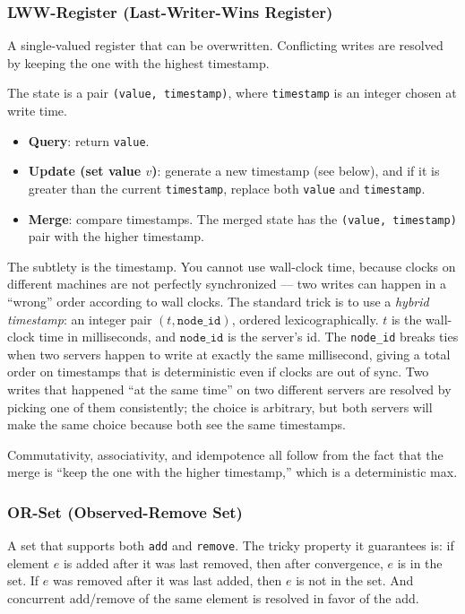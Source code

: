 \documentclass[11pt,a4paper]{article}
\begin{document}
\subsubsection{LWW-Register (Last-Writer-Wins Register)}
A single-valued register that can be overwritten. Conflicting writes are resolved by keeping the one with the highest timestamp.

The state is a pair \texttt{(value, timestamp)}, where \texttt{timestamp} is an integer chosen at write time.

\begin{itemize}
\item \textbf{Query}: return \texttt{value}.
\item \textbf{Update (set value $v$)}: generate a new timestamp (see below), and if it is greater than the current \texttt{timestamp}, replace both \texttt{value} and \texttt{timestamp}.
\item \textbf{Merge}: compare timestamps. The merged state has the \texttt{(value, timestamp)} pair with the higher timestamp.
\end{itemize}

The subtlety is the timestamp. You cannot use wall-clock time, because clocks on different machines are not perfectly synchronized --- two writes can happen in a ``wrong'' order according to wall clocks. The standard trick is to use a \textit{hybrid timestamp}: an integer pair $(t, \texttt{node\_id})$, ordered lexicographically. $t$ is the wall-clock time in milliseconds, and $\texttt{node\_id}$ is the server's id. The \texttt{node\_id} breaks ties when two servers happen to write at exactly the same millisecond, giving a total order on timestamps that is deterministic even if clocks are out of sync. Two writes that happened ``at the same time'' on two different servers are resolved by picking one of them consistently; the choice is arbitrary, but both servers will make the same choice because both see the same timestamps.

Commutativity, associativity, and idempotence all follow from the fact that the merge is ``keep the one with the higher timestamp,'' which is a deterministic max.

\subsubsection{OR-Set (Observed-Remove Set)}
A set that supports both \texttt{add} and \texttt{remove}. The tricky property it guarantees is: if element $e$ is added after it was last removed, then after convergence, $e$ is in the set. If $e$ was removed after it was last added, then $e$ is not in the set. And concurrent add/remove of the same element is resolved in favor of the add.
\end{document}
